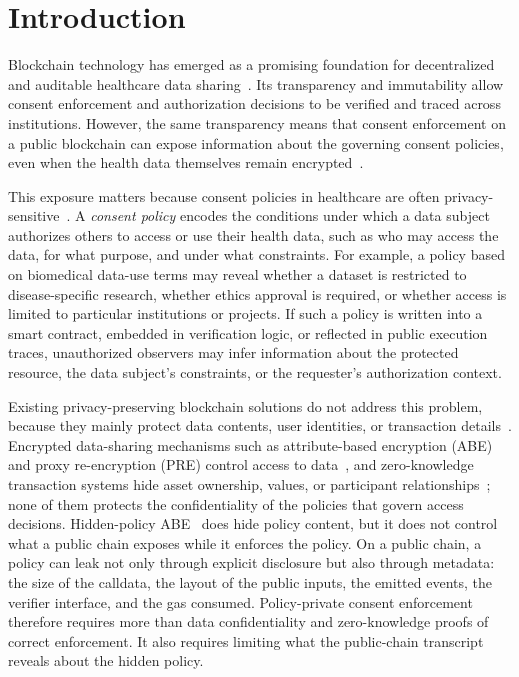 \section{Introduction}
\label{sec:introduction}

Blockchain technology has emerged as a promising foundation for decentralized and auditable healthcare data sharing~\cite{kakarlapudi2021systematic, welzel2025enabling, li2024you}.
Its transparency and immutability allow consent enforcement and authorization decisions to be verified and traced across institutions.
However, the same transparency means that consent enforcement on a public blockchain can expose information about the governing consent policies, even when the health data themselves remain encrypted~\cite{beres2021blockchain, li2025privacy}.

This exposure matters because consent policies in healthcare are often privacy-sensitive~\cite{lawson2021data}.
A \emph{consent policy} encodes the conditions under which a data subject authorizes others to access or use their health data, such as who may access the data, for what purpose, and under what constraints.
For example, a policy based on biomedical data-use terms may reveal whether a dataset is restricted to disease-specific research, whether ethics approval is required, or whether access is limited to particular institutions or projects.
If such a policy is written into a smart contract, embedded in verification logic, or reflected in public execution traces, unauthorized observers may infer information about the protected resource, the data subject's constraints, or the requester's authorization context.

Existing privacy-preserving blockchain solutions do not address this problem, because they mainly protect data contents, user identities, or transaction details~\cite{rondelet2019zeth, williamson2018aztec, nadler2023tornado}.
Encrypted data-sharing mechanisms such as attribute-based encryption (ABE) and proxy re-encryption (PRE) control access to data~\cite{ibraimi2009ciphertext, ullah2023survey}, and zero-knowledge transaction systems hide asset ownership, values, or participant relationships~\cite{zhou2024leveraging}; none of them protects the confidentiality of the policies that govern access decisions.
Hidden-policy ABE~\cite{yang2024hamed,ding2026badsabe} does hide policy content, but it does not control what a public chain exposes while it enforces the policy.
On a public chain, a policy can leak not only through explicit disclosure but also through metadata: the size of the calldata, the layout of the public inputs, the emitted events, the verifier interface, and the gas consumed.
Policy-private consent enforcement therefore requires more than data confidentiality and zero-knowledge proofs of correct enforcement.
It also requires limiting what the public-chain transcript reveals about the hidden policy.

